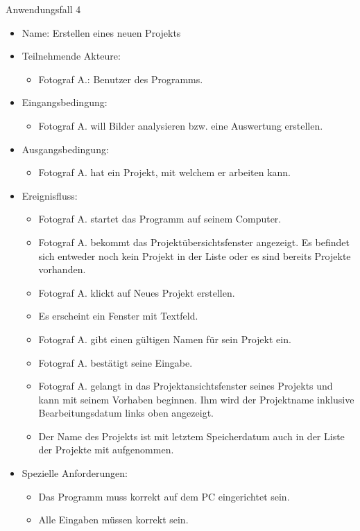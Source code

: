 	\begin{description}
		\item[Anwendungsfall 4]
	\end{description}
	
		\begin{itemize}
			\item Name: Erstellen eines neuen Projekts
			\item Teilnehmende Akteure:
			\begin{itemize}
				\item	Fotograf A.: Benutzer des Programms.
			\end{itemize}
			\item Eingangsbedingung:
			\begin{itemize}
				\item Fotograf A. will Bilder analysieren bzw. eine Auswertung erstellen.						
			\end{itemize}
			\item Ausgangsbedingung:
			\begin{itemize}
				\item	Fotograf A. hat ein Projekt, mit welchem er arbeiten kann.		
			\end{itemize}
			\item Ereignisfluss:
			\begin{itemize}
				\item Fotograf A. startet das Programm auf seinem Computer.
				\item Fotograf A. bekommt das Projektübersichtsfenster angezeigt. Es befindet sich entweder noch kein Projekt in der Liste oder es sind bereits Projekte vorhanden.
				\item Fotograf A. klickt auf Neues Projekt erstellen.
				\item Es erscheint ein Fenster mit Textfeld.
				\item Fotograf A. gibt einen gültigen Namen für sein Projekt ein.
				\item Fotograf A. bestätigt seine Eingabe.
				\item Fotograf A. gelangt in das Projektansichtsfenster seines Projekts und kann mit seinem Vorhaben beginnen. Ihm wird der Projektname inklusive Bearbeitungsdatum links oben angezeigt.
				\item Der Name des Projekts ist mit letztem Speicherdatum auch in der Liste der Projekte mit aufgenommen.
			\end{itemize}
			\item Spezielle Anforderungen:
			\begin{itemize}
				\item	Das Programm muss korrekt auf dem PC eingerichtet sein.
				\item Alle Eingaben müssen korrekt sein.
			\end{itemize}			
		\end{itemize}
		
